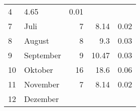 \begin{longtable}{lXrrr}
       \num{4} &
       \num[round-mode=places,round-precision=2]{4,65} &
         \num[round-mode=places,round-precision=2]{0,01} \\

     7 &
     \multicolumn{1}{X}{ Juli   } &


       \num{7} &
       \num[round-mode=places,round-precision=2]{8,14} &
         \num[round-mode=places,round-precision=2]{0,02} \\

     8 &
     \multicolumn{1}{X}{ August   } &


       \num{8} &
       \num[round-mode=places,round-precision=2]{9,3} &
         \num[round-mode=places,round-precision=2]{0,03} \\

     9 &
     \multicolumn{1}{X}{ September   } &


       \num{9} &
       \num[round-mode=places,round-precision=2]{10,47} &
         \num[round-mode=places,round-precision=2]{0,03} \\

     10 &
     \multicolumn{1}{X}{ Oktober   } &


       \num{16} &
       \num[round-mode=places,round-precision=2]{18,6} &
         \num[round-mode=places,round-precision=2]{0,06} \\

     11 &
     \multicolumn{1}{X}{ November   } &


       \num{7} &
       \num[round-mode=places,round-precision=2]{8,14} &
         \num[round-mode=places,round-precision=2]{0,02} \\

     12 &
     \multicolumn{1}{X}{ Dezember   } &



\end{longtable}
